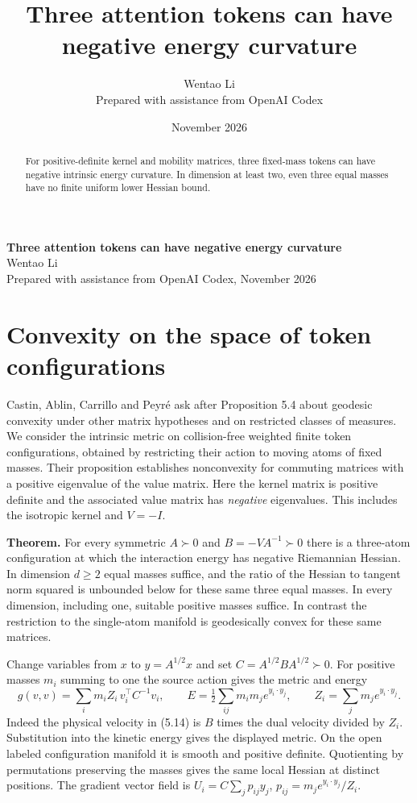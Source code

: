 \documentclass[10pt]{article}
\title{Three attention tokens can have negative energy curvature}
\author{Wentao Li\\{\small Prepared with assistance from OpenAI Codex}}
\date{November 2026}
\begin{document}
\begin{center}{\Large\bfseries Three attention tokens can have negative energy curvature}\\[3pt]Wentao Li\\{\small Prepared with assistance from OpenAI Codex, November 2026}\end{center}
\begin{abstract}
For positive-definite kernel and mobility matrices, three fixed-mass tokens can have negative intrinsic energy curvature. In dimension at least two, even three equal masses have no finite uniform lower Hessian bound.
\end{abstract}
\section*{Convexity on the space of token configurations}
Castin, Ablin, Carrillo and Peyr\'e ask after Proposition 5.4 about geodesic convexity under other matrix hypotheses and on restricted classes of measures. We consider the intrinsic metric on collision-free weighted finite token configurations, obtained by restricting their action to moving atoms of fixed masses. Their proposition establishes nonconvexity for commuting matrices with a positive eigenvalue of the value matrix. Here the kernel matrix is positive definite and the associated value matrix has \emph{negative} eigenvalues. This includes the isotropic kernel and $V=-I$.

\textbf{Theorem.} For every symmetric $A\succ0$ and $B=-VA^{-1}\succ0$ there is a three-atom configuration at which the interaction energy has negative Riemannian Hessian. In dimension $d\ge2$ equal masses suffice, and the ratio of the Hessian to tangent norm squared is unbounded below for these same three equal masses. In every dimension, including one, suitable positive masses suffice. In contrast the restriction to the single-atom manifold is geodesically convex for these same matrices.

Change variables from $x$ to $y=A^{1/2}x$ and set $C=A^{1/2}BA^{1/2}\succ0$. For positive masses $m_i$ summing to one the source action gives the metric and energy
\[
 g(v,v)=\sum_i m_i Z_i\,v_i^\top C^{-1} v_i,\qquad
 E=\tfrac12\sum_{ij} m_i m_j e^{y_i\cdot y_j},\qquad Z_i=\sum_jm_je^{y_i\cdot y_j}.
\]
Indeed the physical velocity in (5.14) is $B$ times the dual velocity divided by $Z_i$. Substitution into the kinetic energy gives the displayed metric. On the open labeled configuration manifold it is smooth and positive definite. Quotienting by permutations preserving the masses gives the same local Hessian at distinct positions. The gradient vector field is $U_i=C\sum_j p_{ij}y_j$, $p_{ij}=m_j e^{y_i\cdot y_j}/Z_i$.
\end{document}
